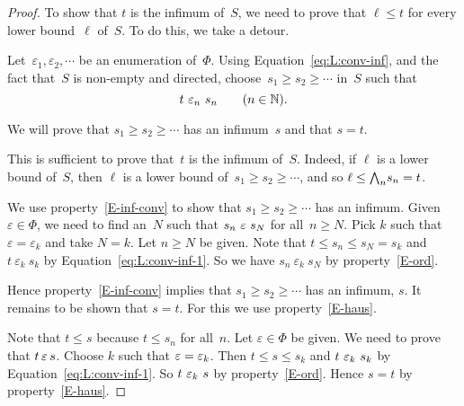 \documentclass[main.tex]{subfiles}
\begin{document}
\begin{proof}
To show that $t$ is the infimum of~$S$,
we need to prove that $\ell \leq t$
for every lower bound~$\ell$ of~$S$.
To do this, we take a detour.

Let~$\varepsilon_1,\varepsilon_2,\dotsb$
be an enumeration of~$\Phi$.
Using Equation~\eqref{eq:L:conv-inf},
and the fact that~$S$ is non-empty and directed,
choose~$s_1 \geq s_2 \geq \dotsb$ in~$S$
such that 
\begin{equation}
\label{eq:L:conv-inf-1}
t\ \varepsilon_n \ s_n\qquad(n\in \mathbb{N}).
\end{equation}

We will prove that
$s_1 \geq s_2 \geq \dotsb$
has an infimum~$s$ and that $s=t$.

This is sufficient to prove that~$t$ is the infimum of~$S$.
Indeed,
if $\ell$ is a lower bound of~$S$,
then $\ell$ is a lower bound of~$s_1 \geq s_2 \geq\dotsb$,
and so $\ell \leq \textstyle{\bigwedge}_n s_n =t$.

We use property~\ref{E-inf-conv}
to show that $s_1 \geq s_2 \geq\dotsb$
has an infimum.
Given $\varepsilon\in\Phi$,
we need to find an~$N$ such that $s_n \ \varepsilon\ s_N$
for all~$n\geq N$. Pick $k$ such that $\varepsilon=\varepsilon_k$
and take $N=k$. Let $n\geq N$ be given.
Note that $t \leq s_n \leq s_N =s_k$
and $t\ \varepsilon_k\ s_k$
by Equation~\eqref{eq:L:conv-inf-1}.
So we have $s_n\ \varepsilon_k\ s_N$ by property~\ref{E-ord}.

Hence property~\ref{E-inf-conv} implies that $s_1 \geq s_2 \geq \dotsb$
has an infimum, $s$.
It remains to be shown that $s=t$.
For this we use property~\ref{E-haus}.

Note that $t\leq s$ because $t\leq s_n$ for all~$n$.
Let $\varepsilon\in\Phi$ be given.
We need to prove that $t \,\varepsilon\, s$.
Choose $k$ such that $\varepsilon = \varepsilon_k$.
Then $t \leq s \leq s_k$
and $t \ \varepsilon_k\ s_k$
by Equation~\eqref{eq:L:conv-inf-1}.
So $t\ \varepsilon_k \  s$ by property~\ref{E-ord}.
Hence $s=t$ by property~\ref{E-haus}.
\end{proof}
%
%
\end{document}
